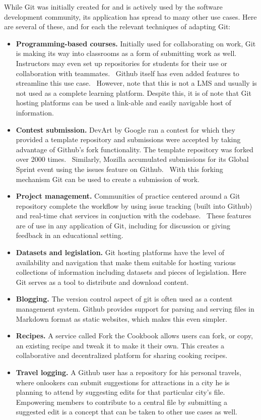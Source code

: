 \documentclass[12pt,twoside]{mitthesis}
\newcommand{\draft}[1]{{#1}}
\begin{document}
\draft{
While Git was initially created for and is actively used by the software development community, its application has spread to many other use cases. Here are several of these, and for each the relevant techniques of adapting Git:
\begin{itemize}
\item \textbf{Programming-based courses.} Initially used for collaborating on work, Git is making its way into classrooms as a form of submitting work as well. Instructors may even set up repositories for students for their use or collaboration with teammates.~\cite{whygithubclassroom} Github itself has even added features to streamline this use case.~\cite{githubclassroom} However, note that this is not a LMS and usually is not used as a complete learning platform. Despite this, it is of note that Git hosting platforms can be used a link-able and easily navigable host of information.
\item \textbf{Contest submission.} DevArt by Google ran a contest for which they provided a template repository and submissions were accepted by taking advantage of Github's fork functionality. The template repository was forked over 2000 times.~\cite{devart} Similarly, Mozilla accumulated submissions for its Global Sprint event using the issues feature on Github.~\cite{globalsprint} With this forking mechanism Git can be used to create a submission of work.
\item \textbf{Project management.} Communities of practice centered around a Git repository complete the workflow by using issue tracking (built into Github) and real-time chat services in conjuction with the codebase.~\cite{githubpm} These features are of use in any application of Git, including for discussion or giving feedback in an educational setting.
\item \textbf{Datasets and legislation.} Git hosting platforms have the level of availability and navigation that make them suitable for hosting various collections of information including datasets and pieces of legislation. Here Git serves as a tool to distribute and download content.~\cite{sevenwaysgit}
\item \textbf{Blogging.} The version control aspect of git is often used as a content management system. Github provides support for parsing and serving files in Markdown format as static websites, which makes this even simpler.~\cite{whygithubclassroom}
\item \textbf{Recipes.} A service called Fork the Cookbook allows users can fork, or copy, an existing recipe and tweak it to make it their own. This creates a collaborative and decentralized platform for sharing cooking recipes.~\cite{forkthecookbook}
\item \textbf{Travel logging.} A Github user has a repository for his personal travels, where onlookers can submit suggestions for attractions in a city he is planning to attend by suggesting edits for that particular city's file.~\cite{travellog} Empowering members to contribute to a central file by submitting a suggested edit is a concept that can be taken to other use cases as well.
\end{itemize}
}
\end{document}
